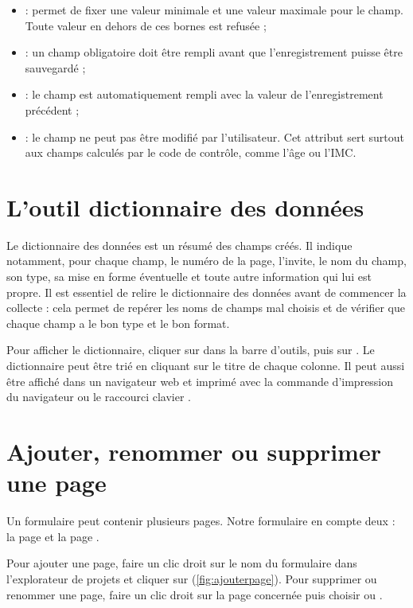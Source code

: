 \begin{itemize}
	\item {} : permet de fixer une valeur minimale et une valeur maximale pour le champ. Toute valeur en dehors de ces bornes est refusée ;
	\item {} : un champ obligatoire doit être rempli avant que l'enregistrement puisse être sauvegardé ;
	\item {} : le champ est automatiquement rempli avec la valeur de l'enregistrement précédent ;
	\item {} : le champ ne peut pas être modifié par l'utilisateur. Cet attribut sert surtout aux champs calculés par le code de contrôle, comme l'âge ou l'IMC.
\end{itemize}

\section{L'outil dictionnaire des données}

Le dictionnaire des données est un résumé des champs créés. Il indique notamment, pour chaque champ, le numéro de la page, l'invite, le nom du champ, son type, sa mise en forme éventuelle et toute autre information qui lui est propre. Il est essentiel de relire le dictionnaire des données avant de commencer la collecte : cela permet de repérer les noms de champs mal choisis et de vérifier que chaque champ a le bon type et le bon format.

Pour afficher le dictionnaire, cliquer sur  dans la barre d'outils, puis sur . Le dictionnaire peut être trié en cliquant sur le titre de chaque colonne. Il peut aussi être affiché dans un navigateur web et imprimé avec la commande d'impression du navigateur ou le raccourci clavier .

\section{Ajouter, renommer ou supprimer une page}
\label{ajouterPage}

Un formulaire peut contenir plusieurs pages. Notre formulaire en compte deux : la page  et la page .

Pour ajouter une page, faire un clic droit sur le nom du formulaire dans l'explorateur de projets et cliquer sur  (\autoref{fig:ajouterpage}). Pour supprimer ou renommer une page, faire un clic droit sur la page concernée puis choisir  ou .

